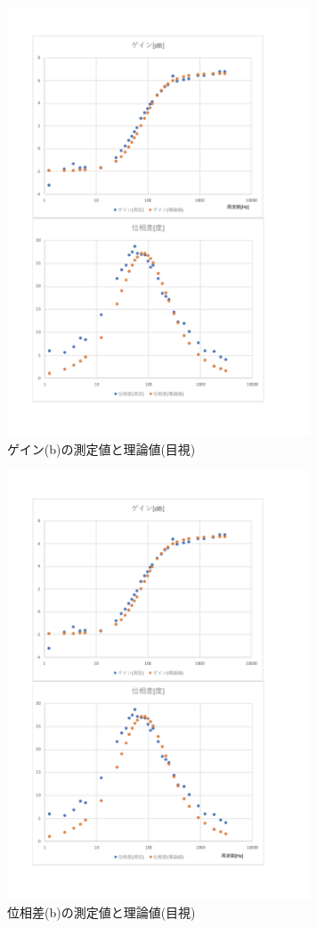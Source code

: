 \documentclass[uplatex, 11pt,a4j, titlepage]{jsarticle}
\begin{document}
\begin{figure}[h]
    \centering
    \includegraphics[width=9cm]{mokushi3.pdf}
    \caption{ゲイン(b)の測定値と理論値(目視)}
    \label{mokushi3}
\end{figure}

\begin{figure}[h]
    \centering
    \includegraphics[width=9cm]{mokushi4.pdf}
    \caption{位相差(b)の測定値と理論値(目視)}
    \label{mokushi4}
\end{figure}
\end{document}

